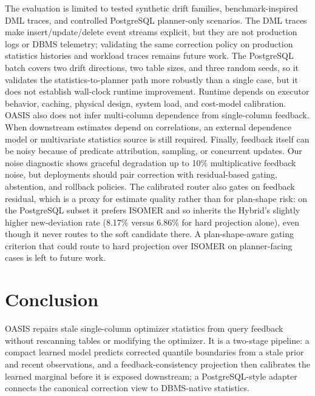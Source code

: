 \documentclass[preprint,12pt]{elsarticle}
\begin{document}
The evaluation is limited to tested synthetic drift families, benchmark-inspired
DML traces, and controlled PostgreSQL planner-only scenarios. The DML traces
make insert/update/delete event streams explicit, but they are not production
logs or DBMS telemetry; validating the same correction policy on production
statistics histories and workload traces remains future work. The PostgreSQL
batch covers two drift directions, two table sizes, and three random seeds, so
it validates the statistics-to-planner path more robustly than a single case,
but it does not establish wall-clock runtime improvement. Runtime depends on
executor behavior, caching, physical design, system load, and cost-model
calibration. OASIS also does not infer multi-column dependence from
single-column feedback. When downstream estimates depend on correlations, an
external dependence model or multivariate statistics source is still required.
Finally, feedback itself can be noisy because of predicate attribution,
sampling, or concurrent updates. Our noise diagnostic shows graceful
degradation up to 10\% multiplicative feedback noise, but deployments should
pair correction with residual-based gating, abstention, and rollback policies.
The calibrated router also gates on feedback residual, which is a proxy for
estimate quality rather than for plan-shape risk: on the PostgreSQL subset it
prefers ISOMER and so inherits the Hybrid's slightly higher new-deviation rate
(8.17\% versus 6.86\% for hard projection alone), even though it never routes to
the soft candidate there. A plan-shape-aware gating criterion that could route to
hard projection over ISOMER on planner-facing cases is left to future work.

\section{Conclusion}
\label{sec:conclusion}

OASIS repairs stale single-column optimizer statistics from query feedback
without rescanning tables or modifying the optimizer. It is a two-stage pipeline:
a compact learned model predicts corrected quantile boundaries from a stale prior
and recent observations, and a feedback-consistency projection then calibrates
the learned marginal before it is exposed downstream; a PostgreSQL-style adapter
connects the canonical correction view to DBMS-native statistics.
\end{document}
